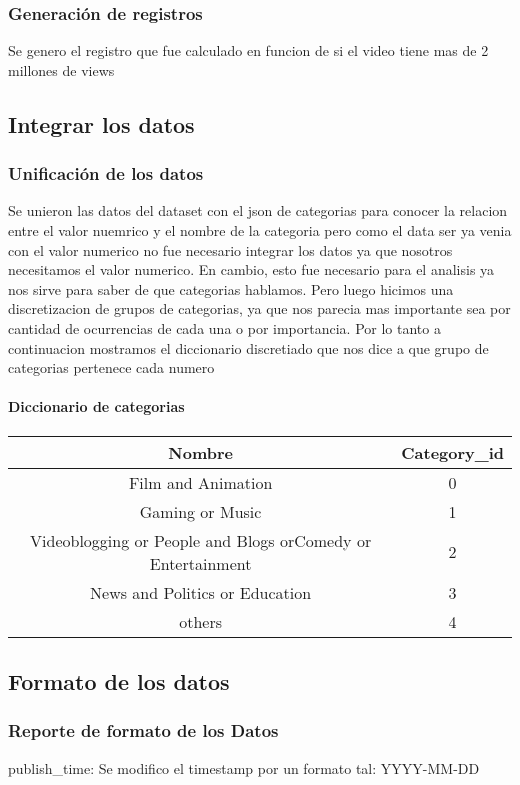     \subsubsection{Generación de registros}
        Se genero el registro  que fue calculado en funcion de si
        el video tiene mas de 2 millones de views

\subsection{Integrar los datos}
    \subsubsection{Unificación de los datos}

        Se unieron las datos del dataset con el json de categorias para conocer
        la relacion entre el valor nuemrico y el nombre de la categoria pero como
        el data ser ya venia con el valor numerico no fue necesario integrar los
        datos ya que nosotros necesitamos el valor numerico. En cambio, esto fue
        necesario para el analisis ya nos sirve para saber de que categorias
        hablamos. Pero luego hicimos una discretizacion de grupos de categorias,
        ya que nos parecia mas importante sea por cantidad de ocurrencias de
        cada una o por importancia.
        Por lo tanto a continuacion mostramos el diccionario discretiado que nos
        dice a que grupo de categorias pertenece cada numero\\

        \paragraph{Diccionario de categorias}

            \begin{center}
                \begin{tabular}{||c | c||}
                    \hline
                    \textbf{Nombre} & \textbf{Category\_id} \\ [0.5ex]
                    \hline\hline
                    Film and Animation & 0 \\
                    \hline
                    Gaming or Music & 1 \\
                    \hline
                    Videoblogging or People and Blogs orComedy or Entertainment & 2 \\
                    \hline
                    News and Politics or Education & 3 \\
                    \hline
                    others & 4 \\
                    \hline
                \end{tabular}
            \end{center}

\subsection{Formato de los datos}
    \subsubsection{Reporte de formato de los Datos}
        publish\_time: Se modifico el timestamp por un formato tal: YYYY-MM-DD
